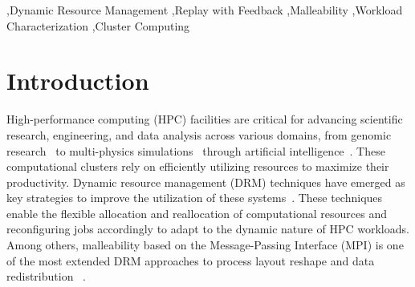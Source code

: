 \documentclass[a4paper,fleqn]{cas-dc}
\begin{document}

\begin{keywords}
\sep Dynamic Resource Management
\sep Replay with Feedback
\sep Malleability
\sep Workload Characterization
\sep Cluster Computing
\end{keywords}

\maketitle

\section{Introduction}\label{intro}
High-performance computing (HPC) facilities are critical for advancing scientific research, engineering, and data analysis across various domains, from genomic research~\cite{martinez_dynamic_2013, zhong_gpu_2025} to multi-physics simulations~\cite{hess_gromacs_2008, vazquez_alya_2016, caviedes-voullieme_serghei_2023} through artificial intelligence~\cite{martinez-cuenca_use_2023, rosciszewski_optimizing_2023, godoy_large_2024}. 
These computational clusters rely on efficiently utilizing resources to maximize their productivity. Dynamic resource management (DRM) techniques have emerged as key strategies to improve the utilization of these systems~\cite{bungartz_invasive_2013, garcia_hints_2014, lopez_openmp_2021}. These techniques enable the flexible allocation and reallocation of computational resources and reconfiguring jobs accordingly to adapt to the dynamic nature of HPC workloads.
Among others, malleability based on the Message-Passing Interface (MPI) is one of the most extended DRM approaches to process layout reshape and data redistribution
~\cite{10.1145/3555819.3555856, iserte_agut_high-throughput_2018, martin_flex-mpi_2013, bhattarai_dynamic_2024}.
\end{document}
